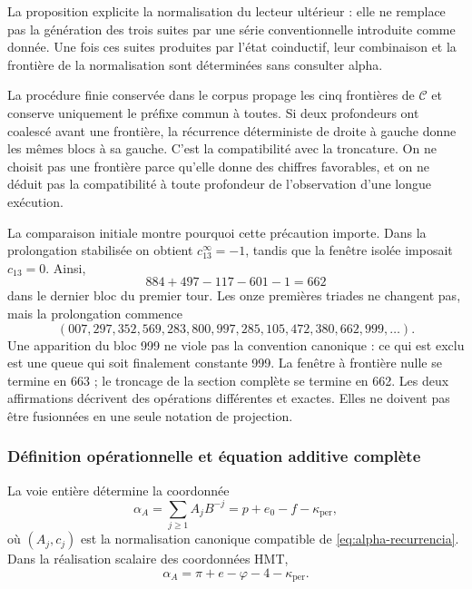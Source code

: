 La proposition explicite la normalisation du lecteur ultérieur : elle ne remplace pas la génération des trois suites par une série conventionnelle introduite comme donnée. Une fois ces suites produites par l'état coinductif, leur combinaison et la frontière de la normalisation sont déterminées sans consulter alpha.

La procédure finie conservée dans le corpus propage les cinq
frontières de \(\mathcal C\) et conserve uniquement le préfixe commun à
toutes. Si deux profondeurs ont coalescé avant une frontière,
la récurrence déterministe de droite à gauche donne les mêmes blocs
à sa gauche. C'est la compatibilité avec la troncature. On ne
choisit pas une frontière parce qu'elle donne des chiffres favorables, et on ne déduit pas la
compatibilité à toute profondeur de l'observation d'une longue exécution.

La comparaison initiale montre pourquoi cette précaution importe. Dans
la prolongation stabilisée on obtient \(c_{13}^{\infty}=-1\), tandis
que la fenêtre isolée imposait \(c_{13}=0\). Ainsi,
\[
 884+497-117-601-1=662
\]
dans le dernier bloc du premier tour. Les onze premières triades ne
changent pas, mais la prolongation commence
\[
 (007,297,352,569,283,800,997,285,105,472,380,662,999,\ldots).
\]
Une apparition du bloc 999 ne viole pas la convention canonique : ce
qui est exclu est une queue qui soit finalement constante 999. La fenêtre
à frontière nulle se termine en 663 ; le troncage de la section complète
se termine en 662. Les deux affirmations décrivent des opérations différentes
et exactes. Elles ne doivent pas être fusionnées en une seule notation de projection.

\subsubsection{Définition opérationnelle et équation additive complète}
\label{subsec:alpha-definicion}

\begin{definition}
\label{def:alpha-operativa}
La voie entière détermine la coordonnée
\begin{equation}
 \alpha_A=\sum_{j\geq1}A_jB^{-j}
 =p+e_0-f-\kappa_{\mathrm{per}},
 \label{eq:alpha-via-a}
\end{equation}
où \((A_j,c_j)\) est la normalisation canonique compatible de
\eqref{eq:alpha-recurrencia}. Dans la réalisation scalaire des
coordonnées HMT,
\begin{equation}
 \boxed{\alpha_A=
 \pi+e-\varphi
 -4-\kappa_{\mathrm{per}}.}
 \label{eq:alpha-identidad-completa}
\end{equation}
\end{definition}

